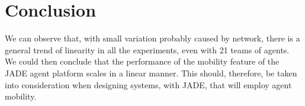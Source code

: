 \documentclass[11pt,titlepage]{article}
\begin{document}
\section{Conclusion}

We can observe that, with small variation probably caused by network, there is a general trend of linearity in all the experiments, even with 21 teams of agents. We could then conclude that the performance of the mobility feature of the JADE agent platform scales in a linear manner. This should, therefore, be taken into consideration when designing systems, with JADE, that will employ agent mobility.

%
%
\end{document}
